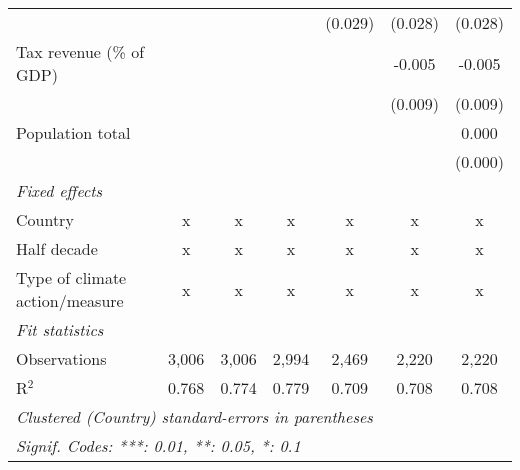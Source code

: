 \begin{tabular}{lcccccc}
                                                                &         &               &               & (0.029)      & (0.028)      & (0.028)\\   
   Tax revenue (\% of GDP)                                      &         &               &               &              & -0.005       & -0.005\\   
                                                                &         &               &               &              & (0.009)      & (0.009)\\   
   Population total                                             &         &               &               &              &              & 0.000\\   
                                                                &         &               &               &              &              & (0.000)\\   
   \emph{Fixed effects}\\
   Country                                                      & x       & x             & x             & x            & x            & x\\  
   Half decade                                                  & x       & x             & x             & x            & x            & x\\  
   Type of climate action/measure                               & x       & x             & x             & x            & x            & x\\  
   \midrule \emph{Fit statistics}\\
   Observations                                                 & 3,006   & 3,006         & 2,994         & 2,469        & 2,220        & 2,220\\  
   R$^2$                                                        & 0.768   & 0.774         & 0.779         & 0.709        & 0.708        & 0.708\\  
   \midrule
   \multicolumn{7}{l}{\emph{Clustered (Country) standard-errors in parentheses}}\\
   \multicolumn{7}{l}{\emph{Signif. Codes: ***: 0.01, **: 0.05, *: 0.1}}\\
\end{tabular}
\par\endgroup


